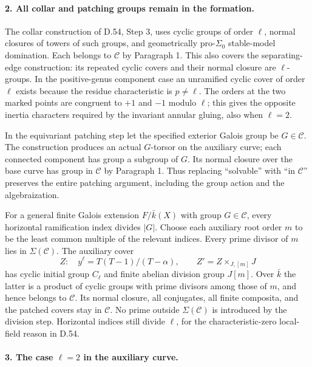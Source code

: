 \paragraph{2. All collar and patching groups remain in the formation.}

The collar construction of D.54, Step 3, uses cyclic groups of
order $\ell$, normal closures of towers of such groups, and
geometrically pro-$\Sigma_0$ stable-model domination.  Each belongs
to $\mathcal C$ by Paragraph 1.  This also covers the separating-edge
construction: its repeated cyclic covers and their normal closure
are $\ell$-groups.  In the positive-genus component case an
unramified cyclic cover of order $\ell$ exists because the residue
characteristic is $p\ne\ell$.  The orders at the two marked points
are congruent to $+1$ and $-1$ modulo $\ell$; this gives the
opposite inertia characters required by the invariant annular
gluing, also when $\ell=2$.

In the equivariant patching step let the specified exterior
Galois group be $G\in\mathcal C$.  The construction produces an
actual $G$-torsor on the auxiliary curve; each connected component
has group a subgroup of $G$.  Its normal closure over the base
curve has group in $\mathcal C$ by Paragraph 1.  Thus replacing
``solvable'' with ``in $\mathcal C$'' preserves the entire patching
argument, including the group action and the algebraization.

For a general finite Galois extension $F/\bar k(X)$ with group
$G\in\mathcal C$, every horizontal ramification index divides
$|G|$.  Choose each auxiliary root order $m$ to be the least common
multiple of the relevant indices.  Every prime divisor of $m$
lies in $\Sigma(\mathcal C)$.  The auxiliary cover
\[
 Z:\quad y^\ell=T(T-1)/(T-\alpha),\qquad
 Z'=Z\times_{J,[m]}J
\]
has cyclic initial group $C_\ell$ and finite abelian division
group $J[m]$.  Over $\bar k$ the latter is a product of cyclic
groups with prime divisors among those of $m$, and hence belongs
to $\mathcal C$.  Its normal closure, all conjugates, all finite
composita, and the patched covers stay in $\mathcal C$.  No prime
outside $\Sigma(\mathcal C)$ is introduced by the division step.
Horizontal indices still divide $\ell$, for the characteristic-zero
local-field reason in D.54.

\paragraph{3. The case $\ell=2$ in the auxiliary curve.}

